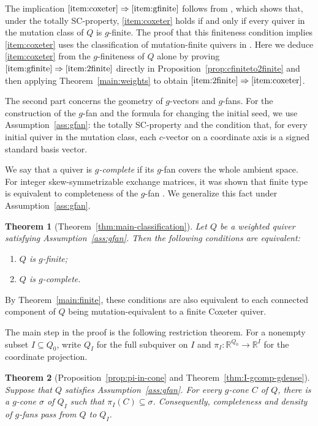 \documentclass[11pt,reqno]{amsart}
\numberwithin{equation}{section}
\theoremstyle{definition}
\theoremstyle{plain}
\newtheorem{maintheorem}{Theorem}
\begin{document}
	The implication $\ref{item:coxeter}\Rightarrow\ref{item:gfinite}$ follows from \cite[Theorem~8.2]{AC25}, which shows that, under the totally SC-property, \ref{item:coxeter} holds if and only if every quiver in the mutation class of $Q$ is $g$-finite. The proof that this finiteness condition implies \ref{item:coxeter} uses the classification of mutation-finite quivers in \cite{FT23}. Here we deduce \ref{item:coxeter} from the $g$-finiteness of $Q$ alone by proving $\ref{item:gfinite}\Rightarrow\ref{item:2finite}$ directly in Proposition~\ref{prop:cfiniteto2finite} and then applying Theorem~\ref{main:weights} to obtain $\ref{item:2finite}\Rightarrow\ref{item:coxeter}$.
	
	The second part concerns the geometry of $g$-vectors and $g$-fans. For the construction of the $g$-fan and the formula for changing the initial seed, we use Assumption~\ref{ass:gfan}: the totally SC-property and the condition that, for every initial quiver in the mutation class, each $c$-vector on a coordinate axis is a signed standard basis vector.
	
	We say that a quiver is \emph{$g$-complete} if its $g$-fan covers the whole ambient space. For integer skew-symmetrizable exchange matrices, it was shown that finite type is equivalent to completeness of the $g$-fan \cite{N26,Y25}. We generalize this fact under Assumption~\ref{ass:gfan}.
	
	\begin{maintheorem}[Theorem~\ref{thm:main-classification}]
		\label{main:fans}
		Let $Q$ be a weighted quiver satisfying Assumption~\ref{ass:gfan}. Then the following conditions are equivalent:
		\begin{enumerate}[label=\textup{(\arabic*)}]
			\item $Q$ is $g$-finite;
			\item $Q$ is $g$-complete.
		\end{enumerate}
	\end{maintheorem}
	
	By Theorem~\ref{main:finite}, these conditions are also equivalent to each connected component of $Q$ being mutation-equivalent to a finite Coxeter quiver.
	
	The main step in the proof is the following restriction theorem. For a nonempty subset $I \subseteq Q_0$, write $Q_I$ for the full subquiver on $I$ and $\pi_I:\mathbb R^{Q_0}\to\mathbb R^I$ for the coordinate projection.
	
	\begin{maintheorem}[Proposition~\ref{prop:pi-in-cone} and Theorem~\ref{thm:I-gcomp-gdense}]
		\label{main:restriction}
		Suppose that $Q$ satisfies Assumption~\ref{ass:gfan}. For every $g$-cone $C$ of $Q$, there is a $g$-cone $\sigma$ of $Q_I$ such that $\pi_I(C)\subseteq\sigma$. Consequently, completeness and density of $g$-fans pass from $Q$ to $Q_I$.
	\end{maintheorem}
	
\end{document}
